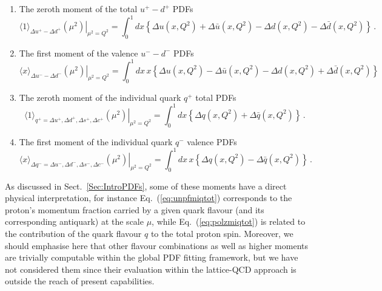 \begin{itemize}
\begin{enumerate}
\item The zeroth moment of the total $u^+-d^+$ PDFs
\begin{equation}
\left.\langle 1 \rangle_{\Delta u^+-\Delta d^+}(\mu^2)\right|_{\mu^2=Q^2}
=
\int_0^1 dx \left\{\Delta u(x,Q^2)+\Delta\bar{u}(x,Q^2)-\Delta d(x,Q^2)-\Delta\bar{d}(x,Q^2)\right\} \, .
\label{eq:polzmumdtot}
\end{equation}

\item The first moment of the valence $u^--d^-$ PDFs
\begin{equation}
\left.\langle x\rangle_{\Delta u^--\Delta d^-}(\mu^2)\right|_{\mu^2=Q^2}
=
\int_0^1 dx\, x\left\{\Delta u(x,Q^2)-\Delta\bar{u}(x,Q^2)-\Delta d(x,Q^2)+\Delta \bar{d}(x,Q^2)\right\}
\label{eq:polfmumdval}  
\end{equation}

\item The zeroth moment of the individual quark $q^+$ total PDFs
\begin{equation}
\left.\langle 1\rangle_{q^+=\Delta u^+,\Delta d^+,\Delta s^+,\Delta c^+}(\mu^2)\right|_{\mu^2=Q^2}
=
\int_0^1 dx \left\{\Delta q(x,Q^2)+\Delta\bar{q}(x,Q^2)\right\} \, .
\label{eq:polzmiqtot}
\end{equation}

\item The first moment of the individual quark $q^-$ valence PDFs
\begin{equation}
\left.\langle x\rangle_{\Delta q^-=\Delta u^-,\Delta d^-,\Delta s^-,\Delta c^-}(\mu^2)\right|_{\mu^2=Q^2}
=
\int_0^1 dx\, x\left\{\Delta q(x,Q^2)-\Delta\bar{q}(x,Q^2)\right\} \, .
\label{eq:polfmiqval}
\end{equation}

\end{enumerate}

\end{itemize}

As discussed in Sect.~\ref{Sec:IntroPDFs}, some of these moments have a direct
physical interpretation, for instance Eq.~(\ref{eq:unpfmiqtot}) corresponds
to the proton's momentum fraction carried by a given quark flavour (and its
corresponding antiquark) at the scale $\mu$, while
Eq.~(\ref{eq:polzmiqtot}) is related to the contribution of the quark flavour
$q$ to the total proton spin.
%
Moreover, we should emphasise here that other flavour combinations as well as higher
moments are trivially computable within the global PDF fitting framework,
but we have not considered them since their evaluation within the lattice-QCD
approach is outside the reach of present capabilities.
